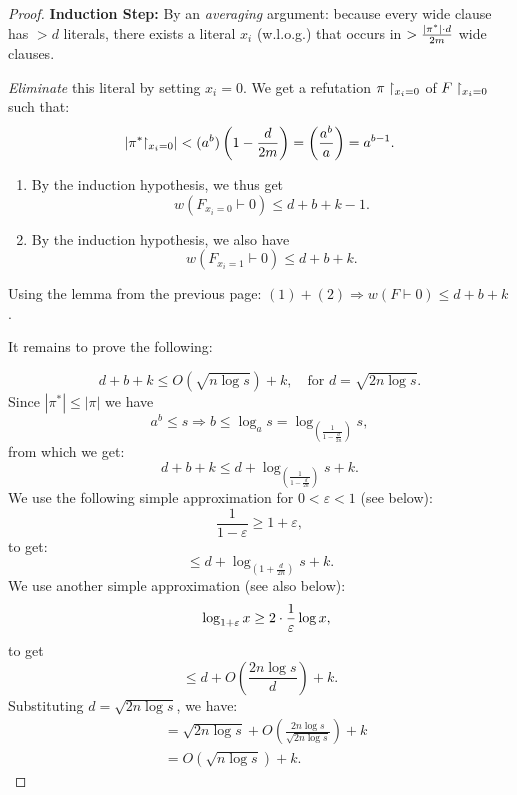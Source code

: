 \begin{proof}
    \textbf{Induction Step:} By an \textit{averaging} argument: because every wide clause has $> d$ literals, there exists a literal $x_i$ (w.l.o.g.) that occurs in $> \frac{|\pi^*|\cdot d}{2m}$ wide clauses.
    
\textit{Eliminate} this literal by setting $x_i = 0$. We get a refutation $\pi\upharpoonright_{x_i = 0}$ of $F\upharpoonright_{x_i = 0}$ such that:
    \[
    \left|\pi^*\!\!\upharpoonright_{x_i = 0}\right| < (a^b) \left( 1 - \frac{d}{2m} \right) = \left( \frac{a^b}{a} \right) = a^{b-1}.
    \]

    \begin{enumerate}
        \item By the induction hypothesis, we thus get
        \[
        w(F_{x_i = 0} \vdash 0) \leq d + b + k - 1.
        \]
        \item By the induction hypothesis, we also have
        \[
        w(F_{x_i = 1} \vdash 0) \leq d + b + k.
        \]
    \end{enumerate}

    Using the lemma from the previous page: $(1) + (2) \Rightarrow w(F \vdash 0) \leq d + b + k$.



It remains to prove the following:


    \[
    d + b + k \leq O\left(\sqrt{n \log s}\right) + k, \quad \text{for } d = \sqrt{2n \log s}.
    \]
Since $|\pi^*|\le|\pi|$ we have
    \[
    a^b \le s \Rightarrow b \le \log_{a} s = 
    \log_{
        \left(
            \frac{1}{1-\frac{d}{2n}}
        \right)
      }s,
    \]
    from which we get:
    \[
    d + b + k \le d + \log_{\left(\frac{1}{1 - \frac{d}{2n}}\right)}s + k.
    \]
    We use the following simple approximation for $0<\varepsilon<1$ (see below):
    \[
    \frac{1}{1 - \varepsilon} \ge  1 + \varepsilon,
    \]
    to get:
    \[
    \leq d + \log_{\left(1 + \frac{d}{2n} \right)} s + k.
    \]
We use another simple approximation (see also below):
\[
 \quad \log_{1+\varepsilon} x \ge 2\cdot \frac{1}{\varepsilon} \log x,
    \]
to get
    \[
    \leq d + O\left(\frac{2n \log s}{d} \right) + k.
    \]
    Substituting $d = \sqrt{2n \log s}$, we have:
    \begin{align*}
    &= \sqrt{2n \log s} + O \left(\frac{2n \log s}{\sqrt{2n \log s}}\right) + k\\
       & = O\left(\sqrt{n \log s} \right) + k.
    \end{align*}
       \mbox{}
\end{proof}

\newcommand{\commentout}[1]{}


